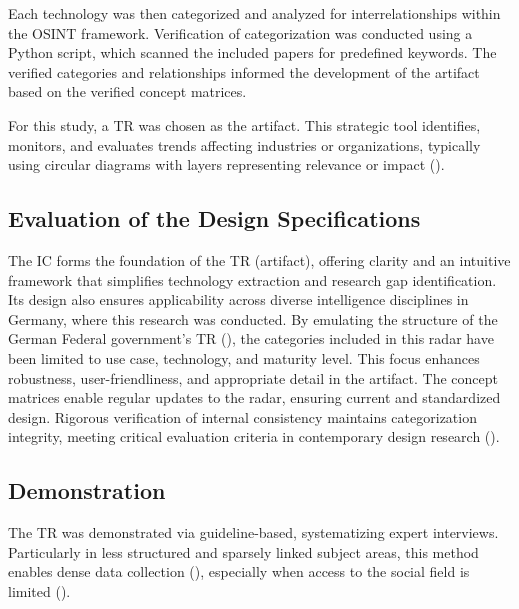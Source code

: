 \documentclass[10pt]{article}
\begin{document}

Each technology was then categorized and analyzed for interrelationships within the OSINT framework. Verification of categorization was conducted using a Python script, which scanned the included papers for predefined keywords. The verified categories and relationships informed the development of the artifact based on the verified concept matrices.

For this study, a TR was chosen as the artifact. This strategic tool identifies, monitors, and evaluates trends affecting industries or organizations, typically using circular diagrams with layers representing relevance or impact (\cite{wulfmettbrenn2017}).

\subsection{Evaluation of the Design Specifications}
The IC forms the foundation of the TR (artifact), offering clarity and an intuitive framework that simplifies technology extraction and research gap identification. Its design also ensures applicability across diverse intelligence disciplines in Germany, where this research was conducted. By emulating the structure of the German Federal government's TR (\cite{Stich.2022}), the categories included in this radar have been limited to use case, technology, and maturity level. This focus enhances robustness, user-friendliness, and appropriate detail in the artifact. The concept matrices enable regular updates to the radar, ensuring current and standardized design. Rigorous verification of internal consistency maintains categorization integrity, meeting critical evaluation criteria in contemporary design research (\cite{vomBrocke.2020b}).


\subsection{Demonstration}
The TR was demonstrated via guideline-based, systematizing expert interviews. Particularly in less structured and sparsely linked subject areas, this method enables dense data collection (\cite{Meuser.1991}), especially when access to the social field is limited (\cite{Glaser.2009}).
\end{document}
